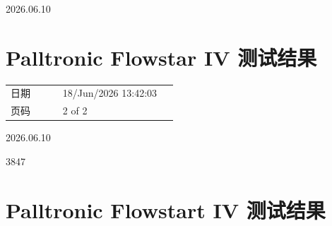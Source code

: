 \documentclass[UTF8,10pt,a4paper,fontset=fandol]{ctexart}
\newcommand{\fieldvalue}[1]{#1}
\newcommand{\handwritten}[1]{#1}
\begin{document}
\vspace{1em}

\handwritten{2026.06.10}

\section{Palltronic Flowstar IV 测试结果}

\begin{tabular}{@{}p{0.28\linewidth}p{0.62\linewidth}@{}}
日期 &
\fieldvalue{18/Jun/2026 13:42:03}
\\
页码 &
\fieldvalue{2 of 2}
\\
\end{tabular}

\vspace{1em}

\begin{center}
\end{center}

\vspace{1em}

\handwritten{2026.06.10}

\handwritten{3847}

\newpage

\section{Palltronic Flowstart IV 测试结果}
\end{document}

